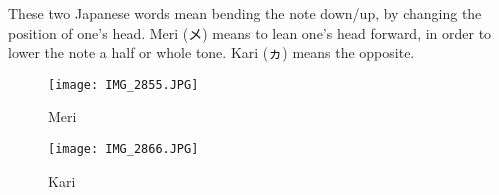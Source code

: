 ﻿These two Japanese words mean bending the note down/up, by changing the position of one’s head.
Meri (メ) means to lean one’s head forward, in order to lower the note a half or whole tone. Kari (ヵ) means the opposite.

\begin{figure}
\centering
\begin{minipage}{0.4\textwidth}
\centering
\texttt{[image: IMG\_2855.JPG]}
\caption{Meri} \label{fig:mult2}
\end{minipage}
\hfill
\begin{minipage}{0.4\textwidth}
\centering
\texttt{[image: IMG\_2866.JPG]}
\caption{Kari} \label{fig:mult3}
\end{minipage}
\end{figure}

